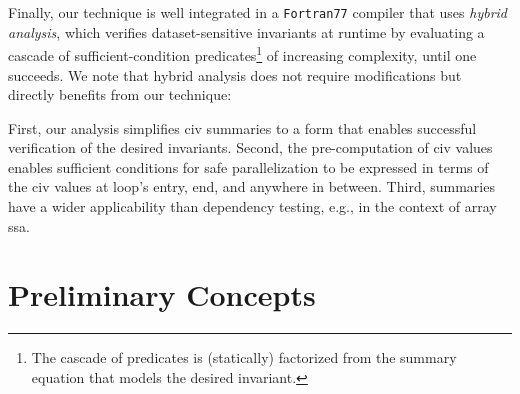 \documentclass{sig-alternate}
\begin{document}
Finally, our technique is well integrated %
in a {\tt Fortran77} compiler that uses {\em hybrid analysis}, 
which verifies dataset-sensitive invariants %
at runtime by evaluating a cascade of sufficient-condition 
predicates\footnote{The cascade of predicates is (statically) 
factorized from the summary equation that models the desired invariant.} 
of increasing complexity, until one succeeds. 
%
We note that hybrid analysis does not require modifications
but directly benefits from our technique: 

First, our analysis simplifies {\sc civ} summaries to a form 
that enables successful verification of the desired invariants. 
Second, the pre-computation of {\sc civ} values enables sufficient 
conditions for safe parallelization to be expressed in terms of 
the {\sc civ} values at loop's entry, end, and anywhere in between. 
Third, summaries have a wider applicability than dependency testing,
e.g., in the context of array {\sc ssa}.






\section{Preliminary Concepts}
\label{sec:Background}
\end{document}
